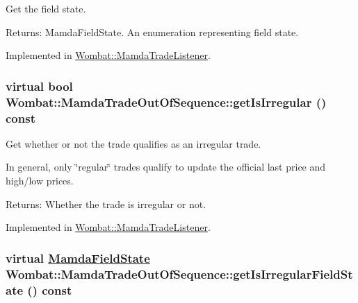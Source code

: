 Get the field state. 

\begin{Desc}
\item[Returns:]Mamda\-Field\-State. An enumeration representing field state. \end{Desc}


Implemented in \hyperlink{classWombat_1_1MamdaTradeListener_ba6a73453e3956f883f40b5ae7d127d0}{Wombat::Mamda\-Trade\-Listener}.\hypertarget{classWombat_1_1MamdaTradeOutOfSequence_21fdd9b443f09d363fa8d3ad02d8306d}{
\subsubsection[getIsIrregular]{\setlength{\rightskip}{0pt plus 5cm}virtual bool Wombat::Mamda\-Trade\-Out\-Of\-Sequence::get\-Is\-Irregular () const}}
\label{classWombat_1_1MamdaTradeOutOfSequence_21fdd9b443f09d363fa8d3ad02d8306d}


Get whether or not the trade qualifies as an irregular trade. 

In general, only \char`\"{}regular\char`\"{} trades qualify to update the official last price and high/low prices.

\begin{Desc}
\item[Returns:]Whether the trade is irregular or not. \end{Desc}


Implemented in \hyperlink{classWombat_1_1MamdaTradeListener_1a5b54d3d63c62bf8720cc29dd40b25a}{Wombat::Mamda\-Trade\-Listener}.\hypertarget{classWombat_1_1MamdaTradeOutOfSequence_5be439fc6e3ede18f1b9858245e1f82d}{
\subsubsection[getIsIrregularFieldState]{\setlength{\rightskip}{0pt plus 5cm}virtual \hyperlink{namespaceWombat_93aac974f2ab713554fd12a1fa3b7d2a}{Mamda\-Field\-State} Wombat::Mamda\-Trade\-Out\-Of\-Sequence::get\-Is\-Irregular\-Field\-State () const}}
\label{classWombat_1_1MamdaTradeOutOfSequence_5be439fc6e3ede18f1b9858245e1f82d}


